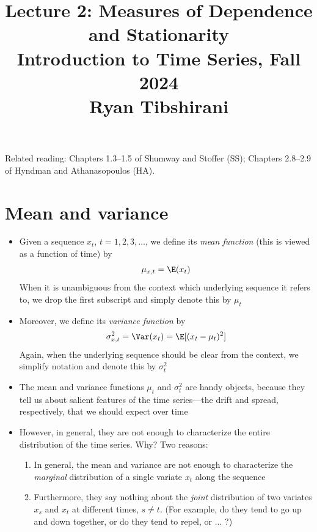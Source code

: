 \documentclass{article}
\title{Lecture 2: Measures of Dependence and Stationarity \\ \smallskip  
\large Introduction to Time Series, Fall 2024 \\ \smallskip
Ryan Tibshirani}
\date{}
\begin{document}
\maketitle
\RaggedRight
\vspace{-50pt}

Related reading: Chapters 1.3--1.5 of Shumway and Stoffer (SS); Chapters
2.8--2.9 of Hyndman and Athanasopoulos (HA).  

\section{Mean and variance}

\begin{itemize}
\item Given a sequence $x_t$, $t = 1,2,3,\dots$, we define its \emph{mean 
    function} (this is viewed as a function of time) by 
  \[
  \mu_{x,t} = \E(x_t)
  \]
  When it is unambiguous from the context which underlying sequence it refers
  to, we drop the first subscript and simply denote this by $\mu_t$

\item Moreover, we define its \emph{variance function} by
  \[
  \sigma^2_{x,t} = \Var(x_t) = \E[(x_t - \mu_t)^2]
  \]
  Again, when the underlying sequence should be clear from the context, we
  simplify notation and denote this by $\sigma^2_t$

\item The mean and variance functions $\mu_t$ and $\sigma^2_t$ are handy 
  objects, because they tell us about salient features of the time series---the
  drift and spread, respectively, that we should expect over time

\item However, in general, they are not enough to characterize the entire
  distribution of the time series. Why? Two reasons: 

  \begin{enumerate}
  \item In general, the mean and variance are not enough to characterize the
    \emph{marginal} distribution of a single variate $x_t$ along the sequence 

  \item Furthermore, they say nothing about the \emph{joint} distribution of
    two variates $x_s$ and $x_t$ at different times, $s \not= t$. (For example,
    do they tend to go up and down together, or do they tend to repel, or ... ?) 
  \end{enumerate}


\end{itemize}
\end{document}
